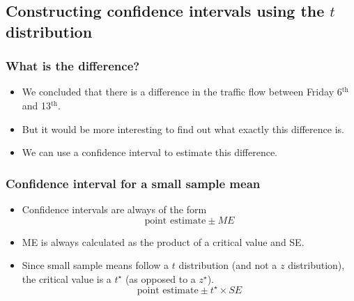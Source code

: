 \subsection{Constructing confidence intervals using the $t$ distribution}


\begin{frame}
\frametitle{What is the difference?}

\begin{itemize}

\item We concluded that there is a difference in the traffic flow between Friday 6$^{\text{th}}$ and 13$^{\text{th}}$.

\pause

\item But it would be more interesting to find out what exactly this difference is.

\pause

\item We can use a confidence interval to estimate this difference.

\end{itemize}

\end{frame}


\begin{frame}
\frametitle{Confidence interval for a small sample mean}

\begin{itemize}

\item Confidence intervals are always of the form
\[ \text{point estimate} \pm {ME} \]

\pause

\item ME is always calculated as the product of a critical value and SE.

\pause

\item Since small sample means follow a $t$ distribution (and not a $z$ distribution), the critical value is a $t^\star$ (as opposed to a $z^\star$).
\[ \text{point estimate} \pm t^{\star} \times SE \]

\end{itemize}

\end{frame}


